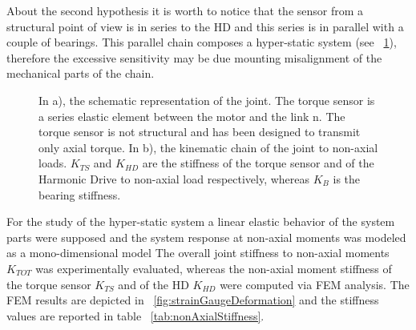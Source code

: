 About the second hypothesis it is worth to notice that the sensor from a structural point of view is in series to the HD and this series is in parallel with a couple of bearings. This parallel chain composes a hyper-static system (see \figurename \ \ref{fig:schemaGiuntoEMolle}), therefore the excessive sensitivity may be due mounting misalignment of the mechanical parts of the chain. 
%
\DIFdelbegin %
\DIFdelend \DIFaddbegin \begin{figure}[b]
	\DIFaddendFL \centering
\DIFdelbeginFL %
\DIFdelendFL %
	\DIFaddbeginFL \def\svgwidth{1\columnwidth}
	\begin{footnotesize}
		
	\end{footnotesize}
	\DIFaddendFL \caption{In a), the schematic representation of the joint. The torque sensor is a series elastic element between the motor and the link n. The torque sensor is not structural and has been designed to transmit only axial torque. In b), the kinematic chain of the joint to non-axial loads. $K_{TS}$ and $K_{HD}$ are the stiffness of the torque sensor and of the Harmonic Drive to non-axial load respectively, whereas $K_B$ is the bearing stiffness.}
	\label{fig:schemaGiuntoEMolle}
\end{figure}
%
\par For the study of the hyper-static system a linear  elastic behavior of the system parts were supposed and the system response at non-axial moments was modeled as a mono-dimensional model\DIFdelbegin {}%
\DIFdelend \DIFaddbegin {}\DIFaddend The overall joint stiffness to non-axial moments $K_{TOT}$ was experimentally evaluated, whereas the non-axial moment stiffness of the torque sensor $K_{TS}$ and of the HD $K_{HD}$ were computed via FEM analysis. The FEM results are depicted in \figurename \ \ref{fig:strainGaugeDeformation} and the stiffness values are reported in table \tablename \ \ref{tab:nonAxialStiffness}.
